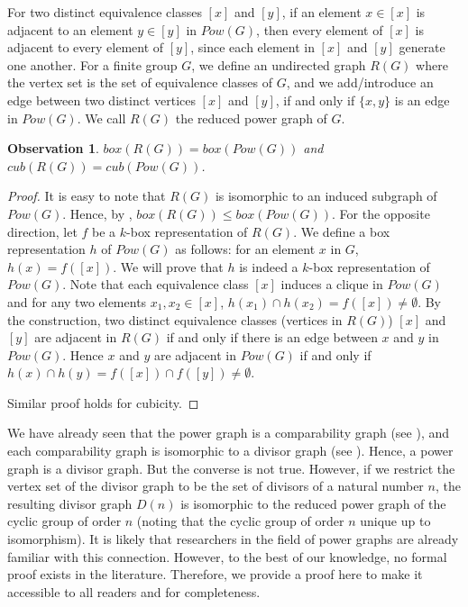 \documentclass[twoside, 11pt]{article}
\newtheorem{observation}{Observation}
\begin{document}
For two distinct equivalence classes $[x]$ and $[y]$, if an element $x\in [x]$ is adjacent to an element $y\in [y]$ in $Pow(G)$, then every element of $[x]$ is adjacent to every element of $[y]$, since each element in $[x]$ and $[y]$ generate one another.  For a finite group $G$, we define an undirected graph $R(G)$ where the vertex set is the set of equivalence classes of $G$, and we add/introduce an edge between two distinct vertices $[x]$ and $[y]$, if and only if $\{x,y\}$ is an edge in $Pow(G)$. We call $R(G)$ the reduced power graph of $G$. 

\begin{observation}\label{boxicity of reduced power graph}
    $box(R(G))=box(Pow(G))$ and $cub(R(G))=cub(Pow(G))$.
\end{observation}
\begin{proof}
    It is easy to note that $R(G)$ is isomorphic to an induced subgraph of $Pow(G)$. Hence, by , %
    $box(R(G)) \leq box(Pow(G))$. For the opposite direction, let $f$ be a $k$-box representation of $R(G)$. We define a box representation $h$ of $Pow(G)$ as follows: for an element $x$ in $G$, $h(x)= f([x])$. We will prove that $h$ is indeed a $k$-box representation of $Pow(G)$. Note that each equivalence class $[x]$ induces a clique in $Pow(G)$ and for any two elements $x_1,x_2 \in [x]$, $h(x_1) \cap h(x_2) = f([x])\neq \emptyset$. By the construction, two distinct equivalence classes (vertices in $R(G)$) $[x]$ and $[y]$ are adjacent in $R(G)$ if and only if there is an edge between $x$ and $y$ in $Pow(G)$. Hence $x$ and $y$ are adjacent in $Pow(G)$ if and only if $h(x)\cap h(y)=f([x]) \cap f([y]) \neq \emptyset$. 

    Similar proof holds for cubicity.
\end{proof}

We have already seen that the power graph is a comparability graph (see ), and each comparability graph is isomorphic to a divisor graph (see ). Hence, a power graph is a divisor graph. But the converse is not true. However, if we restrict the vertex set of 
the divisor graph to be the set of divisors of a natural number $n$, the resulting divisor graph $D(n)$ is isomorphic to the reduced power graph of the cyclic group of order $n$ (noting that the cyclic group of order $n$ unique up to isomorphism). It is likely that researchers in the field of power graphs are already familiar with this connection. However, to the best of our knowledge, no formal proof exists in the literature. Therefore, we provide a proof here to make it accessible to all readers and for completeness.
\end{document}

